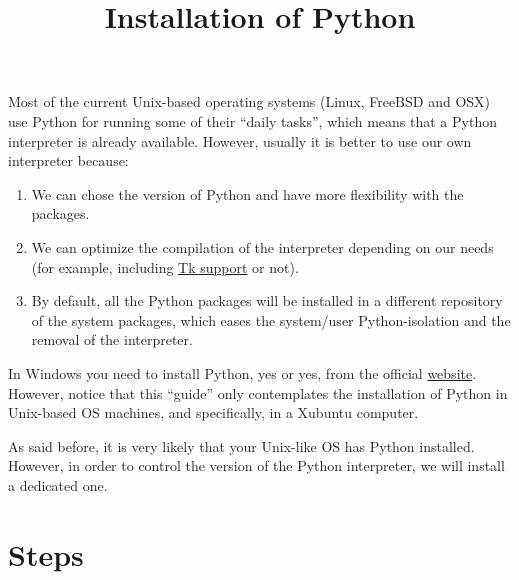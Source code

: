 \title{Installation of Python}

\maketitle

\tableofcontents

Most of the current Unix-based operating systems (Linux, FreeBSD and
OSX) use Python for running some of their ``daily tasks'', which means
that a Python interpreter is already available. However, usually it is
better to use our own interpreter because:

\begin{enumerate}

\item We can chose the version of Python and have more flexibility
  with the packages.

\item We can optimize the compilation of the interpreter depending on
  our needs (for example, including
  \href{https://wiki.python.org/moin/TkInter}{Tk support} or not).

\item By default, all the Python packages will be installed in a
  different repository of the system packages, which eases the
  system/user Python-isolation and the removal of the interpreter.

\end{enumerate}

In Windows you need to install Python, yes or yes, from the official
\href{https://www.python.org/downloads/}{website}. However, notice
that this ``guide'' only contemplates the installation of Python in
Unix-based OS machines, and specifically, in a Xubuntu computer.

As said before, it is very likely that your Unix-like OS has Python
installed. However, in order to control the version of the Python
interpreter, we will install a dedicated one.

\section{Steps}

